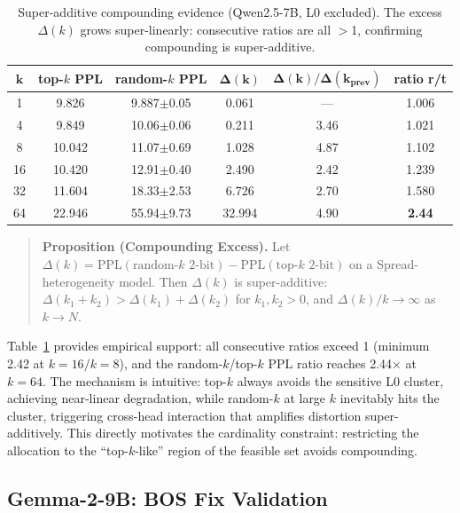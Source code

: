 \documentclass[11pt,a4paper]{article}
\begin{document}
\begin{table}[h]
\centering
\caption{Super-additive compounding evidence (Qwen2.5-7B, L0 excluded). The excess $\Delta(k)$ grows super-linearly: consecutive ratios are all $>$1, confirming compounding is super-additive.}
\label{tab:superadditive}
\begin{tabular}{cccccc}
\toprule
$\boldsymbol{k}$ & \textbf{top-$k$ PPL} & \textbf{random-$k$ PPL} & $\boldsymbol{\Delta(k)}$ & $\boldsymbol{\Delta(k)/\Delta(k_{\text{prev}})}$ & \textbf{ratio r/t} \\
\midrule
1  & 9.826  & 9.887$\pm$0.05  & 0.061  & ---  & 1.006 \\
4  & 9.849  & 10.06$\pm$0.06  & 0.211  & 3.46 & 1.021 \\
8  & 10.042 & 11.07$\pm$0.69  & 1.028  & 4.87 & 1.102 \\
16 & 10.420 & 12.91$\pm$0.40  & 2.490  & 2.42 & 1.239 \\
32 & 11.604 & 18.33$\pm$2.53  & 6.726  & 2.70 & 1.580 \\
64 & 22.946 & 55.94$\pm$9.73  & 32.994 & 4.90 & \textbf{2.44} \\
\bottomrule
\end{tabular}
\end{table}

\begin{quote}
\textbf{Proposition (Compounding Excess).}
Let $\Delta(k) = \text{PPL}(\text{random-}k\text{ 2-bit}) - \text{PPL}(\text{top-}k\text{ 2-bit})$ on a Spread-heterogeneity model.
Then $\Delta(k)$ is super-additive: $\Delta(k_1 + k_2) > \Delta(k_1) + \Delta(k_2)$ for $k_1, k_2 > 0$, and $\Delta(k)/k \to \infty$ as $k \to N$.
\end{quote}

Table~\ref{tab:superadditive} provides empirical support: all consecutive ratios exceed 1 (minimum 2.42 at $k{=}16/k{=}8$), and the random-$k$/top-$k$ PPL ratio reaches 2.44$\times$ at $k{=}64$.
The mechanism is intuitive: top-$k$ always avoids the sensitive L0 cluster, achieving near-linear degradation, while random-$k$ at large $k$ inevitably hits the cluster, triggering cross-head interaction that amplifies distortion super-additively.
This directly motivates the cardinality constraint: restricting the allocation to the ``top-$k$-like'' region of the feasible set avoids compounding.

\subsection{Gemma-2-9B: BOS Fix Validation}
\label{sec:gemma2bos}
\end{document}

